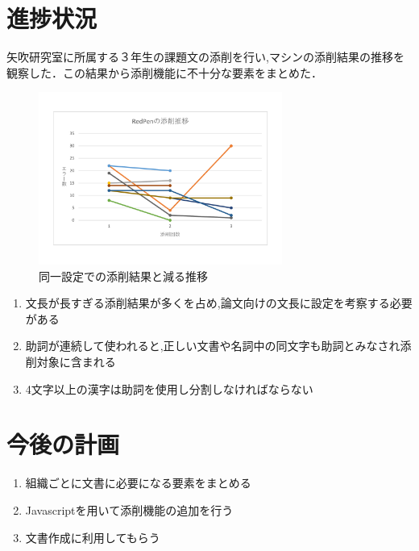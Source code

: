\documentclass[uplatex,twocolumn,dvipdfmx]{jsarticle}
\begin{document}
\section{進捗状況}
矢吹研究室に所属する３年生の課題文の添削を行い,マシンの添削結果の推移を観察した．この結果から添削機能に不十分な要素をまとめた．
\begin{figure}[h]
\centering
\includegraphics[width=8cm,clip]{images.pdf}
\caption{同一設定での添削結果と減る推移}\label{サンプル図}
\end{figure}

\begin{enumerate}
 \item 文長が長すぎる添削結果が多くを占め,論文向けの文長に設定を考察する必要がある
 \item 助詞が連続して使われると,正しい文書や名詞中の同文字も助詞とみなされ添削対象に含まれる
 \item 4文字以上の漢字は助詞を使用し分割しなければならない
\end{enumerate}

\section{今後の計画}
\begin{enumerate}
 \item 組織ごとに文書に必要になる要素をまとめる
 \item Javascriptを用いて添削機能の追加を行う
 \item 文書作成に利用してもらう
\end{enumerate}



\end{document}
